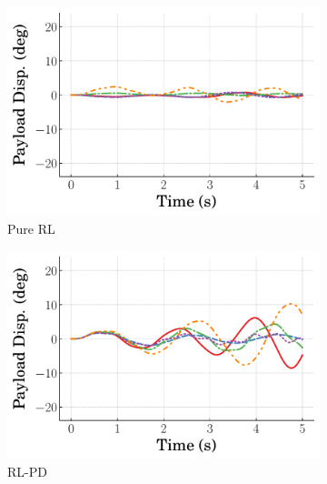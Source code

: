 \begin{figure}[tb]
    \centering
    \begin{subfigure}[b]{0.49\textwidth}
        \centering
        \includegraphics[width=\textwidth]{figures/figures_RL_model_based_control/time_responses_crane/dpcrane_pure_RL/Payload_displacement_0p185_init_0_steps.pdf}
        \caption{Pure RL}
        \label{subfig_chap2:dpcrane_payload_resp_0steps_pure_RL}
    \end{subfigure}
    \hfill
    \begin{subfigure}[b]{0.49\textwidth}
	    \centering
	    \includegraphics[width=\textwidth]{figures/figures_RL_model_based_control/time_responses_crane/dpcrane_cont_gain_sched/Payload_displacement_0p185_init_0_steps.pdf}
	    \caption{RL-PD}
	    \label{subfig_chap2:dpcrane_payload_resp_0steps_gain_sched}
    \end{subfigure}
    \hfill
    \begin{subfigure}[b]{0.49\textwidth}

\end{subfigure}
\end{figure}
